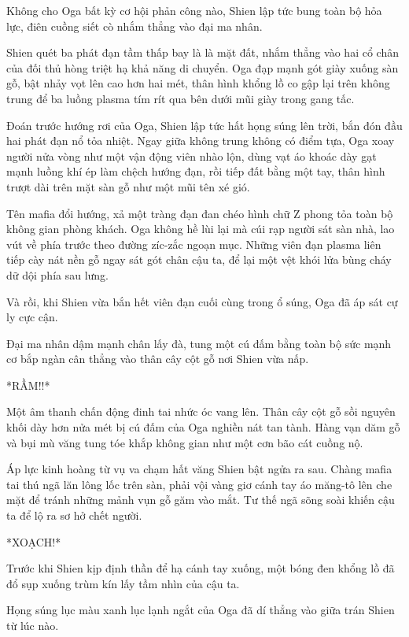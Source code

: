 \documentclass[../main.tex]{subfiles}
\begin{document}
Không cho Oga bất kỳ cơ hội phản công nào, Shien lập tức bung toàn bộ hỏa lực, điên cuồng siết cò nhắm thẳng vào đại ma nhân.

Shien quét ba phát đạn tầm thấp bay là là mặt đất, nhắm thẳng vào hai cổ chân của đối thủ hòng triệt hạ khả năng di chuyển. Oga đạp mạnh gót giày xuống sàn gỗ, bật nhảy vọt lên cao hơn hai mét, thân hình khổng lồ co gập lại trên không trung để ba luồng plasma tím rít qua bên dưới mũi giày trong gang tấc.

Đoán trước hướng rơi của Oga, Shien lập tức hất họng súng lên trời, bắn đón đầu hai phát đạn nổ tỏa nhiệt. Ngay giữa không trung không có điểm tựa, Oga xoay người nửa vòng như một vận động viên nhào lộn, dùng vạt áo khoác dày gạt mạnh luồng khí ép làm chệch hướng đạn, rồi tiếp đất bằng một tay, thân hình trượt dài trên mặt sàn gỗ như một mũi tên xé gió.

Tên mafia đổi hướng, xả một tràng đạn đan chéo hình chữ Z phong tỏa toàn bộ không gian phòng khách. Oga không hề lùi lại mà cúi rạp người sát sàn nhà, lao vút về phía trước theo đường zíc-zắc ngoạn mục. Những viên đạn plasma liên tiếp cày nát nền gỗ ngay sát gót chân cậu ta, để lại một vệt khói lửa bùng cháy dữ dội phía sau lưng.

Và rồi, khi Shien vừa bắn hết viên đạn cuối cùng trong ổ súng, Oga đã áp sát cự ly cực cận.

Đại ma nhân dậm mạnh chân lấy đà, tung một cú đấm bằng toàn bộ sức mạnh cơ bắp ngàn cân thẳng vào thân cây cột gỗ nơi Shien vừa nấp.


*RẦM!!*

Một âm thanh chấn động đinh tai nhức óc vang lên. Thân cây cột gỗ sồi nguyên khối dày hơn nửa mét bị cú đấm của Oga nghiền nát tan tành. Hàng vạn dăm gỗ và bụi mù văng tung tóe khắp không gian như một cơn bão cát cuồng nộ.

Áp lực kinh hoàng từ vụ va chạm hất văng Shien bật ngửa ra sau. Chàng mafia tai thú ngã lăn lông lốc trên sàn, phải vội vàng giơ cánh tay áo măng-tô lên che mặt để tránh những mảnh vụn gỗ găm vào mắt. Tư thế ngã sõng soài khiến cậu ta để lộ ra sơ hở chết người.


*XOẠCH!*

Trước khi Shien kịp định thần để hạ cánh tay xuống, một bóng đen khổng lồ đã đổ sụp xuống trùm kín lấy tầm nhìn của cậu ta.

Họng súng lục màu xanh lục lạnh ngắt của Oga đã dí thẳng vào giữa trán Shien từ lúc nào.
\end{document}
